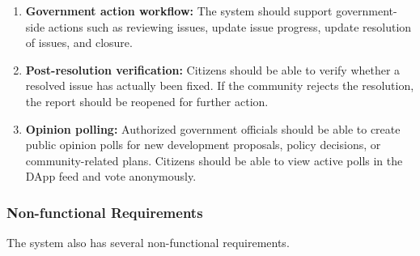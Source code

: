 \begin{enumerate}
    \item \textbf{Government action workflow:}
    The system should support government-side actions such as reviewing issues, update issue progress, update resolution of issues, and closure.

    \item \textbf{Post-resolution verification:}
    Citizens should be able to verify whether a resolved issue has actually been fixed. If the community rejects the resolution, the report should be reopened for further action.

    \item \textbf{Opinion polling:}
    Authorized government officials should be able to create public opinion polls for
    new development proposals, policy decisions, or community-related plans. Citizens should be able to view active polls in the DApp feed and vote anonymously. 
\end{enumerate}

\subsubsection*{Non-functional Requirements}

The system also has several non-functional requirements.


